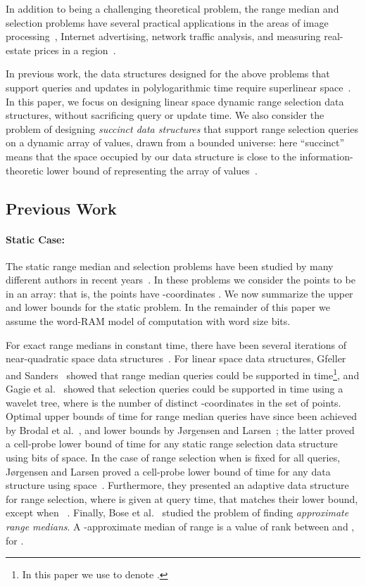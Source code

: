 \documentclass{llncs}
\begin{document}
In addition to being a challenging theoretical problem, the range
median and selection problems have several practical applications in
the areas of image processing~\cite{GW93}, Internet advertising,
network traffic analysis, and measuring real-estate prices in a
region~\cite{HM08}.

In previous work, the data structures designed for the above problems
that support queries and updates in polylogarithmic time require
superlinear space~\cite{BGJS10}.  In this paper, we focus on designing
linear space dynamic range selection data structures, without
sacrificing query or update time.  We also consider the problem of
designing \emph{succinct data structures} that support range selection
queries on a dynamic array of values, drawn from a bounded universe:
here ``succinct'' means that the space occupied by our data structure
is close to the information-theoretic lower bound of representing the
array of values~\cite{J89}.

\subsection{Previous Work\label{sec:previousresults}}



\paragraph{Static Case:}

The static range median and selection problems have been studied by
many different authors in recent
years~\cite{BKMT05,KMS05,HM08,P08,PG09,GPT09,GS09,BJ09,BGJS10,JL11}.
In these problems we consider the  points to be in an array: that
is, the points have -coordinates .  We now summarize
the upper and lower bounds for the static problem.  In the remainder
of this paper we assume the word-RAM model of computation with word
size  bits.


For exact range medians in constant time, there have been several
iterations of near-quadratic space data
structures~\cite{KMS05,P08,PG09}. For linear space data structures,
Gfeller and Sanders~\cite{GS09} showed that range median queries could
be supported in  time\footnote{In this paper we use 
  to denote .}, and Gagie et al.~\cite{GPT09} showed that
selection queries could be supported in  time using a
wavelet tree, where  is the number of distinct -coordinates
in the set of points.  Optimal upper bounds of 
time for range median queries have since been achieved by Brodal et
al.~\cite{BJ09,BGJS10}, and lower bounds by J{\o}rgensen and
Larsen~\cite{JL11}; the latter proved a cell-probe lower bound of
 time for any static range selection data
structure using  bits of space.  In the case of
range selection when  is fixed for all queries, J{\o}rgensen and
Larsen proved a cell-probe lower bound of 
time for any data structure using 
space~\cite{JL11}.  Furthermore, they presented an adaptive data
structure for range selection, where  is given at query time, that
matches their lower bound, except when ~\cite{JL11}.  Finally, Bose et al.~\cite{BKMT05} studied the
problem of finding \emph{approximate range medians}.  A
-approximate median of range  is a value of rank between
 and , for .
\end{document}
